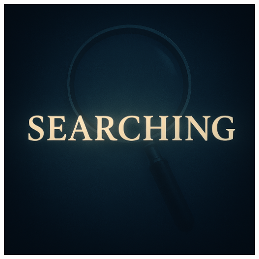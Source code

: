 \documentclass[a4paper,10pt]{book}
\begin{document}
\vspace{50mm}

\begin{center}
\includegraphics[height=13.88cm, width=17cm, keepaspectratio]{Pics/search.png}
\end{center}
\end{document}
